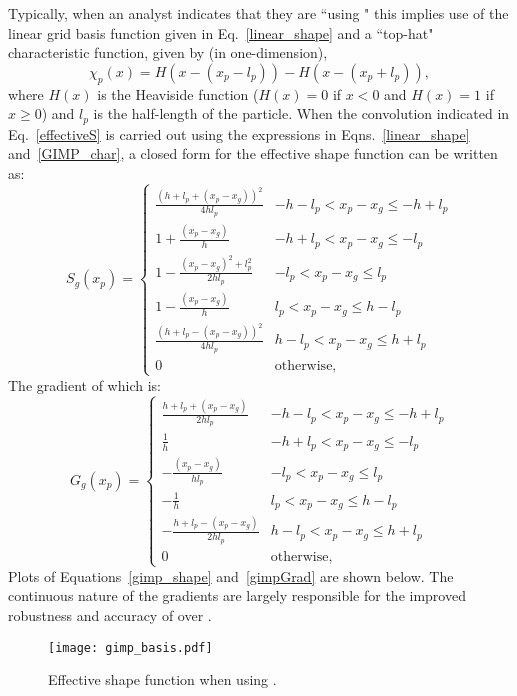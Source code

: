 Typically, when an analyst indicates that
they are ``using \GIMP" this implies use of the linear grid basis function
given in Eq.~\ref{linear_shape} and a ``top-hat" characteristic function,
given by (in one-dimension),
\begin{equation} \label{GIMP_char}
\chi_p(x) = H(x-(x_p-l_p))-H(x-(x_p+l_p)) ,
\end{equation}
where $H(x)$ is the Heaviside function
($H(x)=0$ if $x<0$ and $H(x)=1$ if $x\ge0$) and $l_p$ is the half-length
of the particle.  When the convolution indicated in Eq.~\ref{effectiveS}
is carried out using the expressions in Eqns.~\ref{linear_shape}
 and~\ref{GIMP_char}, a closed form for the effective shape function can be
written as:
\begin{equation} \label{gimp_shape}
S_{g}\left(x_p\right) = \begin{cases}
   \frac{\left(h+l_p+\left(x_p-x_g\right)\right)^2}{4hl_p} & {-h -l_p < x_p-x_g \le -h+l_p} \\
   1 + \frac{\left(x_p-x_g\right)}{h} & {-h + l_p < x_p-x_g \le -l_p} \\
   1 - \frac{\left(x_p-x_g\right)^2 + l_p^2}{2hl_p} & {-l_p < x_p-x_g \le l_p} \\
   1 - \frac{\left(x_p-x_g\right)}{h} & {l_p  < x_p-x_g \le h-l_p} \\
   \frac{\left(h+l_p-\left(x_p-x_g\right)\right)^2}{4hl_p} & {h -l_p < x_p-x_g \le h+l_p} \\
   0 & \text{otherwise},
\end{cases}
\end{equation}
The gradient of which is:
\begin{equation} \label{gimpGrad}
G_g(x_p) = \begin{cases}
   \frac{h+l_p+\left(x_p-x_g\right)}{2 h l_p} & {-h -l_p < x_p-x_g \le -h+l_p} \\
   \frac{1}{h} & {-h + l_p < x_p-x_g \le -l_p} \\
   - \frac{\left(x_p-x_g\right)}{h l_p} & {-l_p < x_p-x_g \le l_p} \\
   - \frac{1}{h} & {l_p  < x_p-x_g \le h-l_p} \\
   - \frac{h+l_p-\left(x_p-x_g\right)}{2 h l_p} & {h -l_p < x_p-x_g \le h+l_p} \\
   0 & \text{otherwise},
\end{cases}
\end{equation}
Plots of Equations~\ref{gimp_shape} and~\ref{gimpGrad} are shown
below.  The continuous nature of the gradients are largely responsible
for the improved robustness and accuracy of \GIMP over \MPM.
\begin{figure}
  \centering
  \texttt{[image: gimp\_basis.pdf]}
  \caption{Effective shape function when using \GIMP.}
  \label{Fig:GIMP}
\end{figure}

